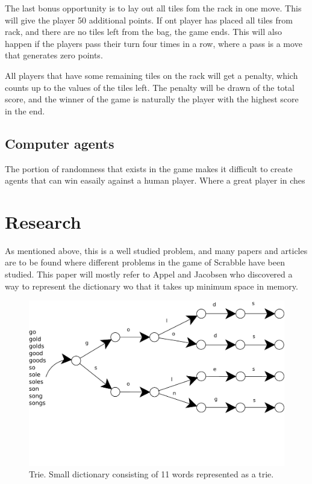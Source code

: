 \documentclass[a4paper, 12pt]{report}
\begin{document}
The last bonus opportunity is to lay out all tiles fom the rack in one move. This will give the player 50  additional points. If ont player has placed all tiles from rack, and there are no tiles left from the bag, the game ends. This will also happen if the players pass their turn four times in a row, where a pass is a move that generates zero points. 

All players that have some remaining tiles on the rack will get a penalty, which counts up to the values of the tiles left. The penalty will be drawn of the total score, and the winner of the game is naturally the player with the highest score in the end.

\subsection{Computer agents}
The portion of randomness that exists in the game makes it difficult to create agents that can win easaily against a human player. Where a great player in ches
\section{Research}
As mentioned above, this is a well studied problem, and many papers and articles are to be found where different problems in the game of Scrabble have been studied. This paper will mostly refer to Appel and Jacobsen \cite{fastest} who discovered a way to represent the dictionary wo that it takes up minimum space in memory.
\begin{figure}
\centering
\includegraphics[scale=0.5]{trie}
\caption{Trie. Small dictionary consisting of 11 words represented as a trie.}
\end{figure}
\end{document}
